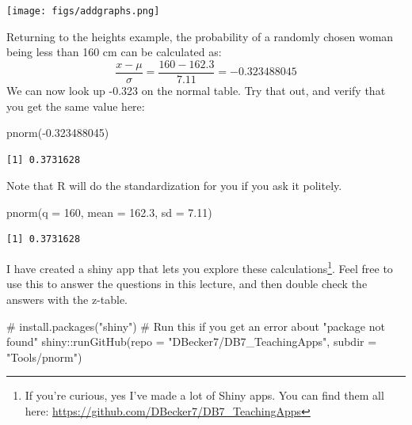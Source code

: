\documentclass[
  letterpaper,
  DIV=11,
  numbers=noendperiod]{scrreprt}
\newenvironment{Shaded}{\begin{snugshade}}{\end{snugshade}}
\newcommand{\AttributeTok}[1]{\textcolor[rgb]{0.40,0.45,0.13}{#1}}
\newcommand{\CommentTok}[1]{\textcolor[rgb]{0.37,0.37,0.37}{#1}}
\newcommand{\DecValTok}[1]{\textcolor[rgb]{0.68,0.00,0.00}{#1}}
\newcommand{\FloatTok}[1]{\textcolor[rgb]{0.68,0.00,0.00}{#1}}
\newcommand{\FunctionTok}[1]{\textcolor[rgb]{0.28,0.35,0.67}{#1}}
\newcommand{\NormalTok}[1]{\textcolor[rgb]{0.00,0.23,0.31}{#1}}
\newcommand{\SpecialCharTok}[1]{\textcolor[rgb]{0.37,0.37,0.37}{#1}}
\newcommand{\StringTok}[1]{\textcolor[rgb]{0.13,0.47,0.30}{#1}}
\begin{document}
\texttt{[image: figs/addgraphs.png]}

Returning to the heights example, the probability of a randomly chosen
woman being less than 160 cm can be calculated as: \[
\frac{x - \mu}{\sigma} = \frac{160 - 162.3}{7.11} = -0.323488045
\] We can now look up -0.323 on the normal table. Try that out, and
verify that you get the same value here:

\begin{Shaded}
\begin{Highlighting}[]
\FunctionTok{pnorm}\NormalTok{(}\SpecialCharTok{{-}}\FloatTok{0.323488045}\NormalTok{)}
\end{Highlighting}
\end{Shaded}

\begin{verbatim}
[1] 0.3731628
\end{verbatim}

Note that R will do the standardization for you if you ask it politely.

\begin{Shaded}
\begin{Highlighting}[]
\FunctionTok{pnorm}\NormalTok{(}\AttributeTok{q =} \DecValTok{160}\NormalTok{, }\AttributeTok{mean =} \FloatTok{162.3}\NormalTok{, }\AttributeTok{sd =} \FloatTok{7.11}\NormalTok{)}
\end{Highlighting}
\end{Shaded}

\begin{verbatim}
[1] 0.3731628
\end{verbatim}

I have created a shiny app that lets you explore these
calculations\footnote{If you're curious, yes I've made a lot of Shiny
  apps. You can find them all here:
  \url{https://github.com/DBecker7/DB7_TeachingApps}}. Feel free to use
this to answer the questions in this lecture, and then double check the
answers with the z-table.

\begin{Shaded}
\begin{Highlighting}[]
\CommentTok{\# install.packages("shiny") \# Run this if you get an error about "package not found"}
\NormalTok{shiny}\SpecialCharTok{::}\FunctionTok{runGitHub}\NormalTok{(}\AttributeTok{repo =} \StringTok{"DBecker7/DB7\_TeachingApps"}\NormalTok{, }
    \AttributeTok{subdir =} \StringTok{"Tools/pnorm"}\NormalTok{)}
\end{Highlighting}
\end{Shaded}
\end{document}
